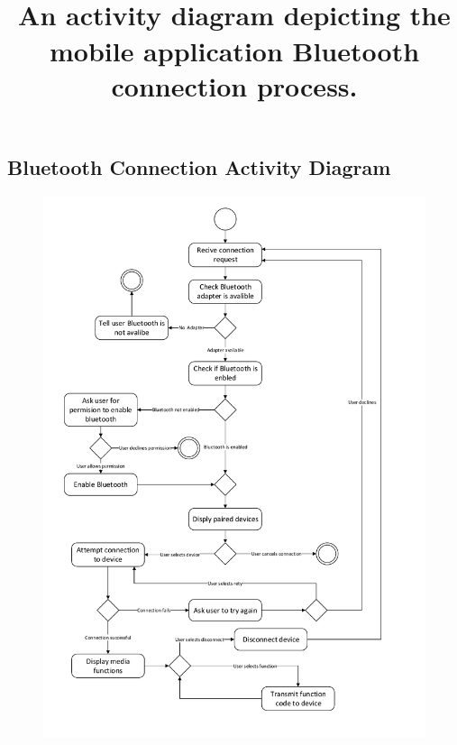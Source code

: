 \documentclass{article}
\begin{document}
\begin{appendices}
		\section{Bluetooth Connection Activity Diagram}
			\begin{figure}[H]
				\centering
				\label{AppBtActivity}
				\includegraphics*[scale = 0.75]{applicationConnectionActivity}
				\title{\\An activity diagram depicting the mobile application Bluetooth connection process.}
			\end{figure}
			

\end{appendices}
\end{document}
